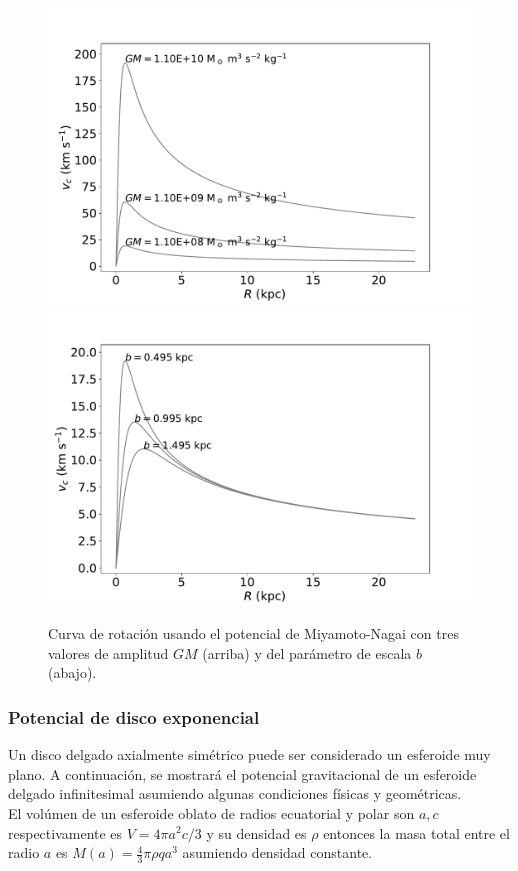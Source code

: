 \begin{figure}
  \centering
    \includegraphics[width=0.8\columnwidth]{Kap2/MN_Amp.pdf}
    \includegraphics[width=0.8\columnwidth]{Kap2/MN_b.pdf}
  \caption{ Curva de rotación usando el potencial de Miyamoto-Nagai con tres valores de amplitud $GM$ (arriba) y del parámetro de escala $b$ (abajo).}
  \label{fig:Fig_MN_parameters}
\end{figure}


\subsubsection{Potencial de disco exponencial}
Un disco delgado axialmente simétrico puede ser considerado un esferoide muy plano. A continuación, se mostrará el potencial gravitacional de un esferoide  delgado infinitesimal asumiendo algunas condiciones físicas y geométricas.\\

El volúmen de un esferoide oblato de radios ecuatorial y polar son $a, c$ respectivamente es $V=4\pi a^2c/3$ y su densidad es $\rho$ entonces la masa total entre el radio $a$ es $M(a)=\frac{4}{3} \pi \rho q a^3$ asumiendo densidad constante.

